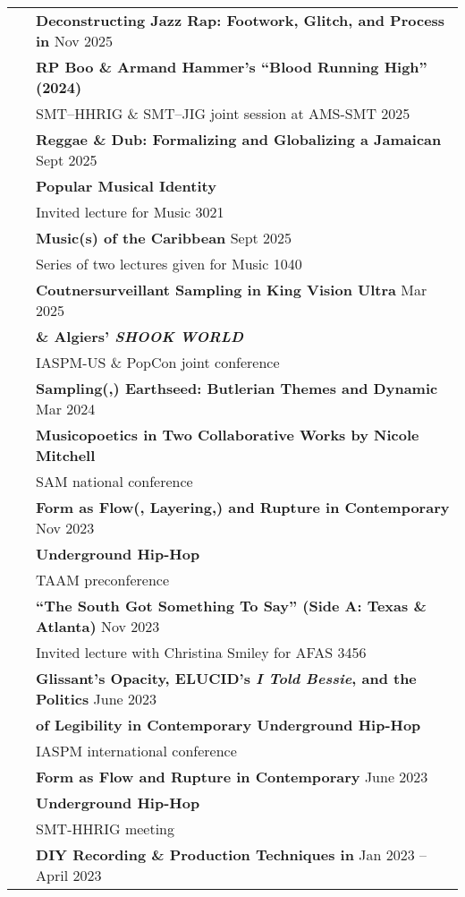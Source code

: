 \documentclass[letterpaper, 11pt]{article}
\begin{document}
\begin{longtable}{p{1.3in}p{4.8in}}
{\color{OliveGreen}{Presentations}}
& \textbf{Deconstructing Jazz Rap: Footwork, Glitch, and Process in} \hfill{Nov 2025} \\
{\color{OliveGreen}{\& Lectures}}
& \textbf{RP Boo \& Armand Hammer's ``Blood Running High'' (2024)} \\
& SMT--HHRIG \& SMT--JIG joint session at AMS-SMT 2025 \\
& \textbf{Reggae \& Dub: Formalizing and Globalizing a Jamaican} \hfill{Sept 2025} \\
& \textbf{Popular Musical Identity} \\
& Invited lecture for Music 3021 \\
& \textbf{Music(s) of the Caribbean} \hfill{Sept 2025} \\
& Series of two lectures given for Music 1040 \\
& \textbf{Coutnersurveillant Sampling in King Vision Ultra} \hfill{Mar 2025} \\
\ & \textbf{\& Algiers' \textit{SHOOK WORLD}} \\
& IASPM-US \& PopCon joint conference \\
& \textbf{Sampling(,) Earthseed: Butlerian Themes and Dynamic} \hfill{Mar 2024} \\
& \textbf{Musicopoetics in  Two Collaborative Works by Nicole Mitchell} \\
& SAM national conference \\
& \textbf{Form as Flow(, Layering,) and Rupture in Contemporary} \hfill{Nov 2023}  \\
& \textbf{Underground Hip-Hop}  \\
& TAAM preconference \\
& \textbf{``The South Got Something To Say'' (Side A: Texas \& Atlanta)} \hfill{Nov 2023}  \\
& Invited lecture with Christina Smiley for AFAS 3456 \\
& \textbf{Glissant's Opacity, ELUCID's \textit{I Told Bessie}, and the Politics} \hfill{June 2023} \\
& \textbf{of Legibility in Contemporary Underground Hip-Hop} \\
& IASPM international conference \\
& \textbf{Form as Flow and Rupture in Contemporary} \hfill{June 2023} \\
& \textbf{Underground Hip-Hop} \\
& SMT-HHRIG meeting\\
& \textbf{DIY Recording \& Production Techniques in} \hfill{Jan 2023 -- April 2023} \\

\end{longtable}
\end{document}
